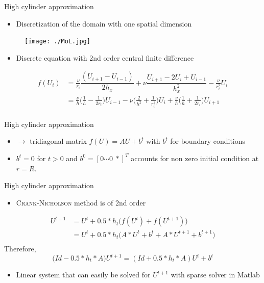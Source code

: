 \documentclass{beamer}
\begin{document}
\begin{frame}{High cylinder approximation}
\begin{itemize}
\item Discretization of the domain with one spatial dimension
\end{itemize}
\begin{figure}[!h]
\centering
\texttt{[image: ./MoL.jpg]}
\end{figure}

\begin{itemize}
\item Discrete equation with 2nd order central finite difference
\end{itemize}
\begin{align*}
f(U_i ) &= \frac{\nu}{r_i}\dfrac{(U_{i+1}-U_{i-1})}{2h_x}+\nu\dfrac{U_{i+1}-2U_{i}+U_{i-1}}{h_{x}^{2}} -\frac{\nu}{r_{i}^2}U_{i}\\
&= \frac{\nu}{h}\Big( \frac{1}{h} - \frac{1}{2r_i}\Big)U_{i-1} 
 -\nu\Big( \frac{2}{h^2} + \frac{1}{r_{i}^{2}}\Big)U_{i}
+ \frac{\nu}{h}\Big( \frac{1}{h} + \frac{1}{2r_i}\Big)U_{i+1}\\
\end{align*} 
\end{frame}

\begin{frame}{High cylinder approximation}
\begin{itemize}
\item $\rightarrow$ tridiagonal matrix $f(U) = AU+b^t$ with $b^t$ for boundary conditions
\item $b^t =0$ for $t>0$ and $b^0  = [0 \cdots 0  ~*]^{T}$ accounts for non zero initial condition at $r=R$.
\end{itemize}
\end{frame}


\begin{frame}{High cylinder approximation}
\begin{itemize}
\item \textsc{Crank-Nicholson} method is of 2nd order
\end{itemize}
\begin{align*}
U^{t+1} &= U^{t} + 0.5*h_{t}\Big(f(U^{t}) + f(U^{t+1})\Big)\\
  &= U^{t} + 0.5*h_{t}\Big(A*U^{t}+b^t + A*U^{t+1} + b^{t+1}\Big)\\
\end{align*}
Therefore,
$$\Big(Id -0.5*h_{t}*A\big)U^{t+1} = (Id + 0.5*h_{t}*A)U^{t}+b^t$$
\begin{itemize}
\item Linear system that can easily be solved for $U^{t+1}$ with sparse solver in Matlab
\end{itemize}
\end{frame}
\end{document}
